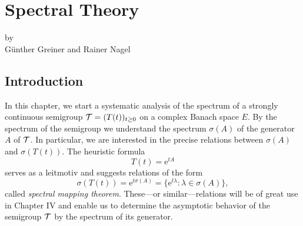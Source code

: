 \chapter{Spectral Theory}\label{chap:a3}%
{\Large
\vspace*{-.75cm}
by \\[.25em]
Günther Greiner and Rainer Nagel 
\vspace{.75cm}
\\
}
\section{Introduction}%
In this chapter, we start a systematic analysis of the spectrum of a strongly continuous semigroup $\mathcal{T} = (T(t))_{t\geq 0}$ on a complex Banach space $E$.
By the spectrum of the semigroup we understand the spectrum $\sigma(A)$ of the generator $A$ of $\mathcal{T}$.
In particular, we are interested in the precise relations between $\sigma(A)$ and $\sigma(T(t))$.
The heuristic formula
\[
	T(t) = \mathrm{e}^{tA}
\]
serves as a leitmotiv and suggests relations of the form
\[
\sigma(T(t)) = \mathrm{e}^{t\sigma(A)} = \{ \mathrm{e}^{t\lambda} \colon \lambda \in \sigma(A) \} ,
\]
called \emph{spectral mapping theorem}.
These---or similar---relations will be of great use in Chapter IV and enable us to determine the asymptotic behavior of the semigroup $\mathcal{T}$ by the spectrum of its generator.

